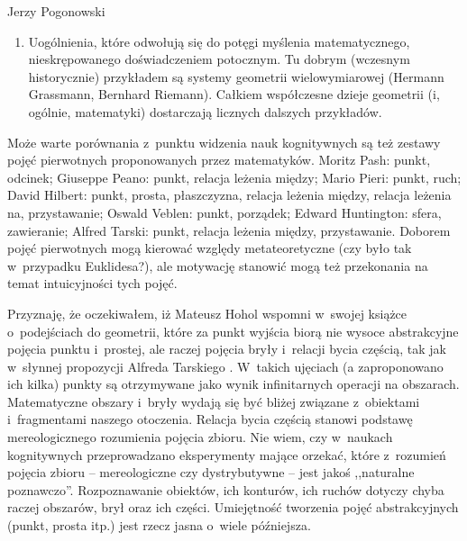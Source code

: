 \begin{newrevplenv}{Jerzy Pogonowski}
\begin{enumerate}
\item Uogólnienia, które odwołują się do potęgi myślenia
matematycznego, nieskrępowanego doświadczeniem potocznym. Tu
dobrym (wczesnym historycznie) przykładem są systemy geometrii
wielowymiarowej (Hermann Grassmann, Bernhard Riemann). Całkiem
współczesne dzieje geometrii (i, ogólnie, matematyki) dostarczają
licznych dalszych przykładów.

\end{enumerate}

Może warte porównania z~punktu widzenia nauk kognitywnych są też
zestawy pojęć pierwotnych proponowanych przez matematyków. Moritz
Pash: punkt, odcinek; Giuseppe Peano: punkt, relacja leżenia
między; Mario Pieri: punkt, ruch; David Hilbert: punkt, prosta,
płaszczyzna, relacja leżenia między, relacja leżenia na,
przystawanie; Oswald Veblen: punkt, porządek; Edward Huntington:
sfera, zawieranie; Alfred Tarski: punkt, relacja leżenia między,
przystawanie. Doborem pojęć pierwotnych mogą kierować względy
metateoretyczne (czy było tak w~przypadku Euklidesa?), ale
motywację stanowić mogą też przekonania na temat intuicyjności
tych pojęć.

Przyznaję, że oczekiwałem, iż Mateusz Hohol wspomni w~swojej
książce o~podejściach do geometrii, które za punkt wyjścia biorą
nie wysoce abstrakcyjne pojęcia punktu i~prostej, ale raczej
pojęcia bryły i~relacji bycia częścią, tak jak w~słynnej
propozycji Alfreda Tarskiego \parencite{tarski_les_1929}. W~takich ujęciach (a
zaproponowano ich kilka) punkty są otrzymywane jako wynik
infinitarnych operacji na obszarach. Matematyczne obszary i~bryły
wydają się być bliżej związane z~obiektami i~fragmentami naszego
otoczenia. Relacja bycia częścią stanowi podstawę mereologicznego
rozumienia pojęcia zbioru. Nie wiem, czy w~naukach kognitywnych
przeprowadzano eksperymenty mające orzekać, które z~rozumień
pojęcia zbioru -- mereologiczne czy dystrybutywne -- jest jakoś
,,naturalne poznawczo''. Rozpoznawanie obiektów, ich konturów, ich
ruchów dotyczy chyba raczej obszarów, brył oraz ich części.
Umiejętność tworzenia pojęć abstrakcyjnych (punkt, prosta itp.)
jest rzecz jasna o~wiele późniejsza.


\end{newrevplenv}
